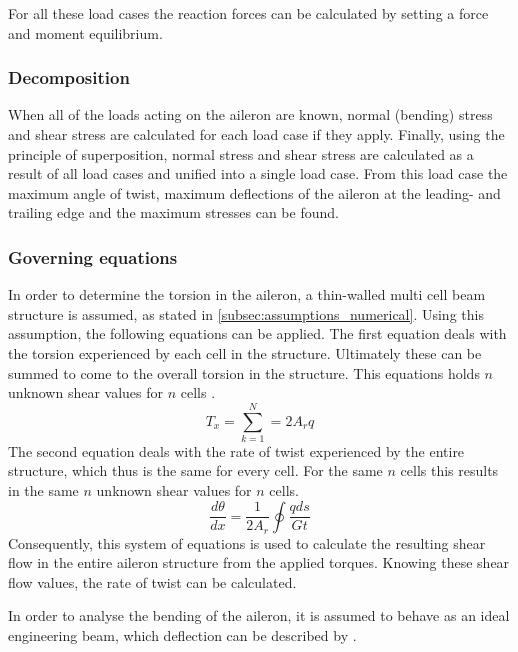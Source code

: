 \noindent For all these load cases the reaction forces can be calculated by setting a force and moment equilibrium.

\subsubsection{Decomposition}
\noindent When all of the loads acting on the aileron are known, normal (bending) stress and shear stress are calculated for each load case if they apply. Finally, using the principle of superposition, normal stress and shear stress are calculated as a result of all load cases and unified into a single load case. From this load case the maximum angle of twist, maximum deflections of the aileron at the leading- and trailing edge and the maximum stresses can be found.


\subsubsection{Governing equations}
\label{subsubsec:gov_eq_numerical}

In order to determine the torsion in the aileron, a thin-walled multi cell beam structure is assumed, as stated in \autoref{subsec:assumptions_numerical}. Using this assumption, the following equations can be applied. The first equation deals with the torsion experienced by each cell in the structure. Ultimately these can be summed to come to the overall torsion in the structure. This equations holds $n$ unknown shear values for $n$ cells \cite{the_book}.
\begin{equation}
    T_x=\sum_{k=1}^{N}=2 A_{r} q
\end{equation}
The second equation deals with the rate of twist experienced by the entire structure, which thus is the same for every cell. For the same $n$ cells this results in the same $n$ unknown shear values for $n$ cells.
\begin{equation}
    \frac{d \theta}{d x}=\frac{1}{2 A_{r}} \oint \frac{q d s}{G t}
\end{equation}
Consequently, this system of equations is used to calculate the resulting shear flow in the entire aileron structure from the applied torques. Knowing these shear flow values, the rate of twist can be calculated.\par
\noindent In order to analyse the bending of the aileron, it is assumed to behave as an ideal engineering beam, which deflection can be described by  \cite{the_book}.

